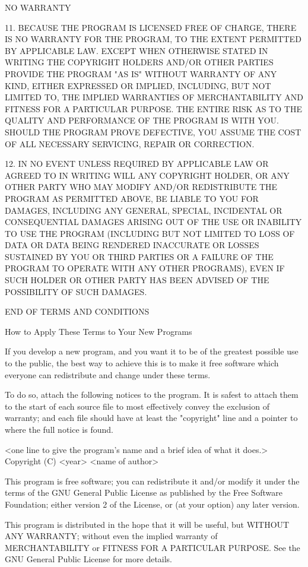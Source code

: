 \documentclass[11pt,a4paper]{article}
\begin{document}
\begin{itemize}
		NO WARRANTY

		11. BECAUSE THE PROGRAM IS LICENSED FREE OF CHARGE, THERE IS NO WARRANTY
		FOR THE PROGRAM, TO THE EXTENT PERMITTED BY APPLICABLE LAW.  EXCEPT WHEN
		OTHERWISE STATED IN WRITING THE COPYRIGHT HOLDERS AND/OR OTHER PARTIES
		PROVIDE THE PROGRAM "AS IS" WITHOUT WARRANTY OF ANY KIND, EITHER EXPRESSED
		OR IMPLIED, INCLUDING, BUT NOT LIMITED TO, THE IMPLIED WARRANTIES OF
		MERCHANTABILITY AND FITNESS FOR A PARTICULAR PURPOSE.  THE ENTIRE RISK AS
		TO THE QUALITY AND PERFORMANCE OF THE PROGRAM IS WITH YOU.  SHOULD THE
		PROGRAM PROVE DEFECTIVE, YOU ASSUME THE COST OF ALL NECESSARY SERVICING,
		REPAIR OR CORRECTION.

		12. IN NO EVENT UNLESS REQUIRED BY APPLICABLE LAW OR AGREED TO IN WRITING
		WILL ANY COPYRIGHT HOLDER, OR ANY OTHER PARTY WHO MAY MODIFY AND/OR
		REDISTRIBUTE THE PROGRAM AS PERMITTED ABOVE, BE LIABLE TO YOU FOR DAMAGES,
		INCLUDING ANY GENERAL, SPECIAL, INCIDENTAL OR CONSEQUENTIAL DAMAGES ARISING
		OUT OF THE USE OR INABILITY TO USE THE PROGRAM (INCLUDING BUT NOT LIMITED
		TO LOSS OF DATA OR DATA BEING RENDERED INACCURATE OR LOSSES SUSTAINED BY
		YOU OR THIRD PARTIES OR A FAILURE OF THE PROGRAM TO OPERATE WITH ANY OTHER
		PROGRAMS), EVEN IF SUCH HOLDER OR OTHER PARTY HAS BEEN ADVISED OF THE
		POSSIBILITY OF SUCH DAMAGES.

		END OF TERMS AND CONDITIONS

		How to Apply These Terms to Your New Programs

		If you develop a new program, and you want it to be of the greatest
		possible use to the public, the best way to achieve this is to make it
		free software which everyone can redistribute and change under these terms.

		To do so, attach the following notices to the program.  It is safest
		to attach them to the start of each source file to most effectively
		convey the exclusion of warranty; and each file should have at least
		the "copyright" line and a pointer to where the full notice is found.

		<one line to give the program's name and a brief idea of what it does.>
		Copyright (C) <year>  <name of author>

		This program is free software; you can redistribute it and/or modify
		it under the terms of the GNU General Public License as published by
		the Free Software Foundation; either version 2 of the License, or
		(at your option) any later version.

		This program is distributed in the hope that it will be useful,
		but WITHOUT ANY WARRANTY; without even the implied warranty of
		MERCHANTABILITY or FITNESS FOR A PARTICULAR PURPOSE.  See the
		GNU General Public License for more details.


\end{itemize}
\end{document}

